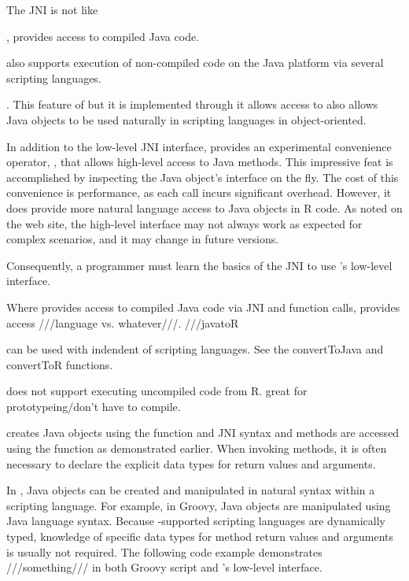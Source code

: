 The JNI is not like 

,  provides access to compiled Java code. 

 also supports execution of non-compiled code on the Java platform via several scripting languages. 

. This feature  of but it is implemented through it allows access to also allows Java objects to be used naturally in scripting languages in object-oriented.

In addition to the low-level JNI interface,  provides an experimental convenience operator, \code{\$}, that allows high-level access to Java methods. This impressive feat is accomplished by inspecting the Java object's interface on the fly. The cost of this convenience is performance, as each call incurs significant overhead. However, it does provide more natural language access to Java objects in R code. As noted on the  web site, the high-level interface may not always work as expected for complex scenarios, and it may change in future versions.

Consequently, a programmer must learn the basics of the JNI to use 's low-level interface.

Where  provides access to compiled Java code via JNI and function calls,  provides access
///language vs. whatever///. ///javatoR

 can be used with  indendent of scripting languages. See the convertToJava and convertToR functions.

 does not support executing uncompiled code from R.  great for prototypeing/don't have to compile.

 creates Java objects using the  function and JNI syntax and methods are accessed using the  function as demonstrated earlier. When invoking methods, it is often necessary to declare the explicit data types for return values and arguments.

In , Java objects can be created and manipulated in natural syntax within a scripting language. For example, in Groovy, Java objects are manipulated using Java language syntax. Because -supported scripting languages are dynamically typed, knowledge of specific data types for method return values and arguments is usually not required. The following code example demonstrates ///something/// in both Groovy script and 's low-level interface.

